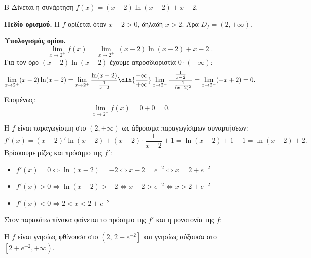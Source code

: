 \begin{thema}{Β}
Δίνεται η συνάρτηση $f(x) = (x-2)\ln(x-2) + x - 2$.

\begin{erwthma}

\item \textbf{Πεδίο ορισμού.} Η $f$ ορίζεται όταν $x - 2 > 0$, δηλαδή $x > 2$.
Άρα $D_f = (2, +\infty)$.

\textbf{Υπολογισμός ορίου.}
\[
\lim_{x \to 2^+} f(x) = \lim_{x \to 2^+} \bigl[(x-2)\ln(x-2) + x - 2\bigr].
\]
Για τον όρο $(x-2)\ln(x-2)$ έχουμε απροσδιοριστία $0 \cdot (-\infty)$:
\[
\lim_{x \to 2^+} (x-2) \ln (x-2) = \lim_{x \to 2^+} \frac{\ln (x-2)}{\frac{1}{x-2}} \dlh{\frac{-\infty}{+\infty}} \lim_{x \to 2^+} \frac{\frac{1}{x-2}}{-\frac{1}{(x-2)^2}} = \lim_{x \to 2^+} (-x+2) = 0.
\]
Επομένως:
\[
\lim_{x \to 2^+} f(x) = 0 + 0 = 0.
\]

\item Η $f$ είναι παραγωγίσιμη στο $(2, +\infty)$ ως άθροισμα παραγωγίσιμων συναρτήσεων:
\[
f'(x) = (x-2)' \ln(x-2) + (x-2) \cdot \frac{1}{x-2} + 1 = \ln(x-2) + 1 + 1 = \ln(x-2) + 2.
\]
Βρίσκουμε ρίζες και πρόσημο της $f'$:
\begin{itemize}
    \item $f'(x) = 0 \Leftrightarrow \ln(x-2) = -2 \Leftrightarrow x - 2 = e^{-2} \Leftrightarrow x = 2 + e^{-2}$
    \item $f'(x) > 0 \Leftrightarrow \ln(x-2) > -2 \Leftrightarrow x - 2 > e^{-2} \Leftrightarrow x > 2 + e^{-2}$
    \item $f'(x) < 0 \Leftrightarrow 2 < x < 2 + e^{-2}$
\end{itemize}
Στον παρακάτω πίνακα φαίνεται το πρόσημο της $f'$ και η μονοτονία της $f$:
\begin{center}
\end{center}
Η $f$ είναι γνησίως φθίνουσα στο $\left(2,\,2+e^{-2}\right]$ και γνησίως αύξουσα στο $\left[2+e^{-2},+\infty\right)$.


\end{erwthma}
\end{thema}
